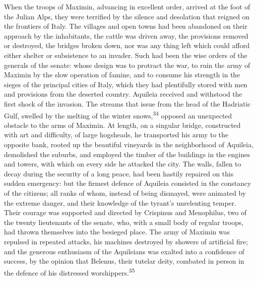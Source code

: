 When the troops of Maximin, advancing in excellent order, arrived
at the foot of the Julian Alps, they were terrified by the
silence and desolation that reigned on the frontiers of Italy.
The villages and open towns had been abandoned on their approach
by the inhabitants, the cattle was driven away, the provisions
removed or destroyed, the bridges broken down, nor was any thing
left which could afford either shelter or subsistence to an
invader. Such had been the wise orders of the generals of the
senate: whose design was to protract the war, to ruin the army of
Maximin by the slow operation of famine, and to consume his
strength in the sieges of the principal cities of Italy, which
they had plentifully stored with men and provisions from the
deserted country. Aquileia received and withstood the first shock
of the invasion. The streams that issue from the head of the
Hadriatic Gulf, swelled by the melting of the winter snows,\textsuperscript{34}
opposed an unexpected obstacle to the arms of Maximin. At length,
on a singular bridge, constructed with art and difficulty, of
large hogsheads, he transported his army to the opposite bank,
rooted up the beautiful vineyards in the neighborhood of
Aquileia, demolished the suburbs, and employed the timber of the
buildings in the engines and towers, with which on every side he
attacked the city. The walls, fallen to decay during the security
of a long peace, had been hastily repaired on this sudden
emergency: but the firmest defence of Aquileia consisted in the
constancy of the citizens; all ranks of whom, instead of being
dismayed, were animated by the extreme danger, and their
knowledge of the tyrant’s unrelenting temper. Their courage was
supported and directed by Crispinus and Menophilus, two of the
twenty lieutenants of the senate, who, with a small body of
regular troops, had thrown themselves into the besieged place.
The army of Maximin was repulsed in repeated attacks, his
machines destroyed by showers of artificial fire; and the
generous enthusiasm of the Aquileians was exalted into a
confidence of success, by the opinion that Belenus, their tutelar
deity, combated in person in the defence of his distressed
worshippers.\textsuperscript{35}


